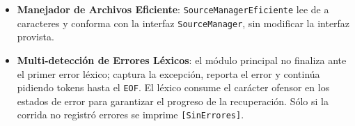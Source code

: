 \documentclass[11pt,a4paper]{article}
\begin{document}
\begin{itemize}
  \item \textbf{Manejador de Archivos Eficiente}: \texttt{SourceManagerEficiente} lee de a
        caracteres y conforma con la interfaz \texttt{SourceManager}, sin modificar la
        interfaz provista.
  \item \textbf{Multi-detección de Errores Léxicos}: el módulo principal no finaliza ante
        el primer error léxico; captura la excepción, reporta el error y continúa pidiendo
        tokens hasta el \texttt{EOF}. El léxico consume el carácter ofensor en los estados
        de error para garantizar el progreso de la recuperación. Sólo si la corrida no
        registró errores se imprime \texttt{[SinErrores]}.
\end{itemize}
\end{document}
